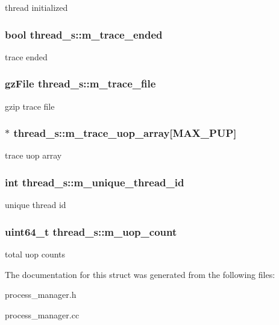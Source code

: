 \label{structthread__s_afc7f4beee3959a7a0e9a783f01094902}
thread initialized \hypertarget{structthread__s_a02fca6a746d6446fce1b5f2c8adf9366}{
\subsubsection[{m\_\-trace\_\-ended}]{\setlength{\rightskip}{0pt plus 5cm}bool {\bf thread\_\-s::m\_\-trace\_\-ended}}}
\label{structthread__s_a02fca6a746d6446fce1b5f2c8adf9366}
trace ended \hypertarget{structthread__s_a96bd9cfd9a5e605f4eee72f92ca9f513}{
\subsubsection[{m\_\-trace\_\-file}]{\setlength{\rightskip}{0pt plus 5cm}gzFile {\bf thread\_\-s::m\_\-trace\_\-file}}}
\label{structthread__s_a96bd9cfd9a5e605f4eee72f92ca9f513}
gzip trace file \hypertarget{structthread__s_a3a1828ec963fd0cba7c0ea8fd96699eb}{
\subsubsection[{m\_\-trace\_\-uop\_\-array}]{$\ast$ {\bf thread\_\-s::m\_\-trace\_\-uop\_\-array}\mbox{[}MAX\_\-PUP\mbox{]}}}
\label{structthread__s_a3a1828ec963fd0cba7c0ea8fd96699eb}
trace uop array \hypertarget{structthread__s_a3fabe97150e2faf6bcdc10e50d6aceee}{
\subsubsection[{m\_\-unique\_\-thread\_\-id}]{\setlength{\rightskip}{0pt plus 5cm}int {\bf thread\_\-s::m\_\-unique\_\-thread\_\-id}}}
\label{structthread__s_a3fabe97150e2faf6bcdc10e50d6aceee}
unique thread id \hypertarget{structthread__s_ab3eae22c15000ab6e61395cb0c56fa20}{
\subsubsection[{m\_\-uop\_\-count}]{\setlength{\rightskip}{0pt plus 5cm}uint64\_\-t {\bf thread\_\-s::m\_\-uop\_\-count}}}
\label{structthread__s_ab3eae22c15000ab6e61395cb0c56fa20}
total uop counts 

The documentation for this struct was generated from the following files:\begin{DoxyCompactItemize}
\item 
process\_\-manager.h\item 
process\_\-manager.cc\end{DoxyCompactItemize}
